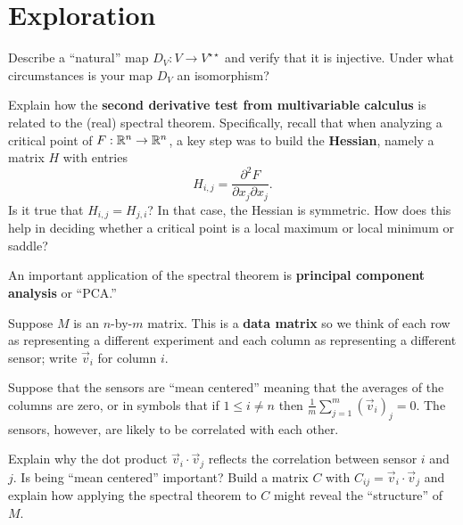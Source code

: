 \documentclass{homework}
\begin{document}





\section{Exploration}

\begin{problem}
  Describe a ``natural'' map $D_V : V \to V^{\star\star}$ and verify
  that it is injective.  Under what circumstances is your map $D_V$ an
  isomorphism?
\end{problem}
\begin{problem}
  Explain how the \textbf{second derivative test from multivariable
    calculus} is related to the (real) spectral theorem.  Specifically, recall that when analyzing a critical point of $F : \mathbb{R}^n \to \mathbb{R}^n$, a key step was to build the \textbf{Hessian}, namely a matrix $H$ with entries
  \[
    H_{i,j} = \frac{\partial^2 F}{\partial x_j \partial x_j}.
  \]
  Is it true that $H_{i,j} = H_{j,i}$?  In that case, the Hessian is
  symmetric.  How does this help in deciding whether a critical point
  is a local maximum or local minimum or saddle?
\end{problem}

\begin{problem}\label{principal-component-analysis}An important application of the spectral theorem is
  \textbf{principal component analysis} or ``PCA.''

  Suppose $M$ is an $n$-by-$m$ matrix.  This is a \textbf{data matrix}
  so we think of each row as representing a different experiment and
  each column as representing a different sensor; write $\vec{v}_i$
  for column $i$.

  Suppose that the sensors are ``mean centered'' meaning that the
  averages of the columns are zero, or in symbols that if
  $1 \leq i \neq n$ then
  \(\displaystyle\frac{1}{m} \sum_{j=1}^m \left(\vec{v}_i\right)_j =
  0\).  The sensors, however, are likely to be correlated with each
  other.

  Explain why the dot product $\vec{v}_i \cdot \vec{v}_j$ reflects the
  correlation between sensor $i$ and $j$.  Is being ``mean centered''
  important?  Build a matrix $C$ with
  $C_{ij} = \vec{v}_i \cdot \vec{v}_j$ and explain how applying the
  spectral theorem to $C$ might reveal the ``structure'' of $M$.
\end{problem}
\end{document}
